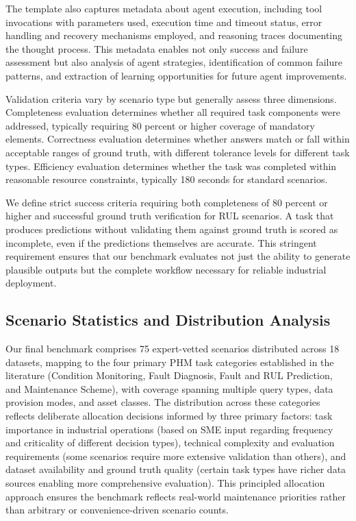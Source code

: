 \documentclass[conference]{IEEEtran}
\begin{document}
The template also captures metadata about agent execution, including tool invocations with parameters used, execution time and timeout status, error handling and recovery mechanisms employed, and reasoning traces documenting the thought process. This metadata enables not only success and failure assessment but also analysis of agent strategies, identification of common failure patterns, and extraction of learning opportunities for future agent improvements.

Validation criteria vary by scenario type but generally assess three dimensions. Completeness evaluation determines whether all required task components were addressed, typically requiring 80 percent or higher coverage of mandatory elements. Correctness evaluation determines whether answers match or fall within acceptable ranges of ground truth, with different tolerance levels for different task types. Efficiency evaluation determines whether the task was completed within reasonable resource constraints, typically 180 seconds for standard scenarios.

We define strict success criteria requiring both completeness of 80 percent or higher and successful ground truth verification for RUL scenarios. A task that produces predictions without validating them against ground truth is scored as incomplete, even if the predictions themselves are accurate. This stringent requirement ensures that our benchmark evaluates not just the ability to generate plausible outputs but the complete workflow necessary for reliable industrial deployment.

\subsection{Scenario Statistics and Distribution Analysis}

Our final benchmark comprises 75 expert-vetted scenarios distributed across 18 datasets, mapping to the four primary PHM task categories established in the literature (Condition Monitoring, Fault Diagnosis, Fault and RUL Prediction, and Maintenance Scheme), with coverage spanning multiple query types, data provision modes, and asset classes. The distribution across these categories reflects deliberate allocation decisions informed by three primary factors: task importance in industrial operations (based on SME input regarding frequency and criticality of different decision types), technical complexity and evaluation requirements (some scenarios require more extensive validation than others), and dataset availability and ground truth quality (certain task types have richer data sources enabling more comprehensive evaluation). This principled allocation approach ensures the benchmark reflects real-world maintenance priorities rather than arbitrary or convenience-driven scenario counts.
\end{document}
